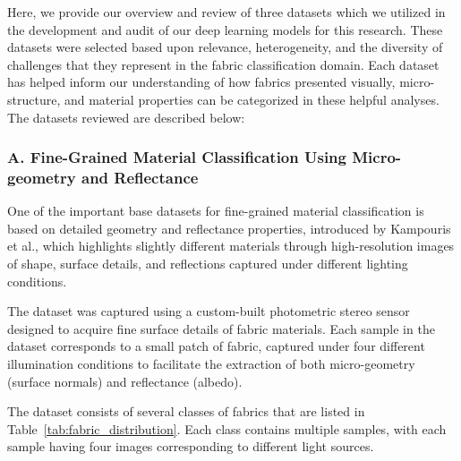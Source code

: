 Here, we provide our overview and review of three datasets which we utilized in the development and audit of our deep learning models for this research. These datasets were selected based upon relevance, heterogeneity, and the diversity of challenges that they represent in the fabric classification domain. Each dataset has helped inform our understanding of how fabrics presented visually, micro-structure, and material properties can be categorized in these helpful analyses. The datasets reviewed are described below:

\subsubsection{A. Fine-Grained Material Classification Using Micro-geometry and Reflectance~\cite{kampouris2016fine}}

One of the important base datasets for fine-grained material classification is based on detailed geometry and reflectance properties, introduced by Kampouris et al., which highlights slightly different materials through high-resolution images of shape, surface details, and reflections captured under different lighting conditions.

The dataset was captured using a custom-built photometric stereo sensor designed to acquire fine surface details of fabric materials. Each sample in the dataset corresponds to a small patch of fabric, captured under four different illumination conditions to facilitate the extraction of both micro-geometry (surface normals) and reflectance (albedo).

The dataset consists of several classes of fabrics that are listed in Table~\ref{tab:fabric_distribution}. Each class contains multiple samples, with each sample having four images corresponding to different light sources.

